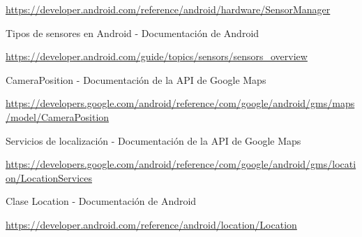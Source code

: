\begin{thebibliography}{9}
	\url{https://developer.android.com/reference/android/hardware/SensorManager}


	Tipos de sensores en Android - Documentación de Android

	\url{https://developer.android.com/guide/topics/sensors/sensors_overview}


	CameraPosition - Documentación de la API de Google Maps

	\url{https://developers.google.com/android/reference/com/google/android/gms/maps/model/CameraPosition}


	Servicios de localización - Documentación de la API de Google Maps

	\url{https://developers.google.com/android/reference/com/google/android/gms/location/LocationServices}



	Clase Location - Documentación de Android

	\url{https://developer.android.com/reference/android/location/Location}

\end{thebibliography}

